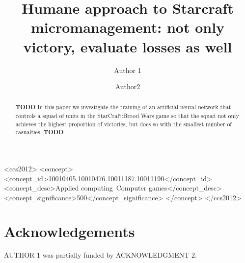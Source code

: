 \documentclass[sigconf, authordraft]{acmart}
\begin{document}
\title{Humane approach to Starcraft micromanagement: not only victory, evaluate losses as well}

\author{Author 1}

\author{Author2}

\begin{abstract}
  {\bf TODO} In this paper we investigate the training of an
  artificial neural network that controls a squad of units in the
  StarCraft:Brood Wars game so that the squad not only achieves the
  highest proportion of victories, but does so with the smallest
  number of casualties. {\bf TODO}
\end{abstract}

\begin{CCSXML}
<ccs2012>
<concept>
<concept_id>10010405.10010476.10011187.10011190</concept_id>
<concept_desc>Applied computing~Computer games</concept_desc>
<concept_significance>500</concept_significance>
</concept>
</ccs2012>
\end{CCSXML}



\maketitle















\section*{Acknowledgements}

AUTHOR 1 was partially funded by ACKNOWLEDGMENT 2.


{}
\end{document}
